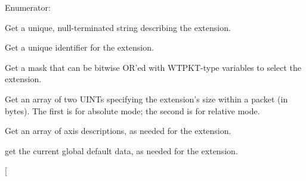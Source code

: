 \begin{Desc}
\item[Enumerator: ]\par
\begin{description}
\item[{\em 
\hypertarget{namespace_wintab_d_n_a52875c234488913934e0d49ac13c438d}{
EXT\_\-NAME}
\label{namespace_wintab_d_n_a52875c234488913934e0d49ac13c438d}
}]Get a unique, null-\/terminated string describing the extension. \item[{\em 
\hypertarget{namespace_wintab_d_n_a52875c234488913934e0d49ac13c438d}{
EXT\_\-TAG}
\label{namespace_wintab_d_n_a52875c234488913934e0d49ac13c438d}
}]Get a unique identifier for the extension. \item[{\em 
\hypertarget{namespace_wintab_d_n_a52875c234488913934e0d49ac13c438d}{
EXT\_\-MASK}
\label{namespace_wintab_d_n_a52875c234488913934e0d49ac13c438d}
}]Get a mask that can be bitwise OR'ed with WTPKT-\/type variables to select the extension. \item[{\em 
\hypertarget{namespace_wintab_d_n_a52875c234488913934e0d49ac13c438d}{
EXT\_\-SIZE}
\label{namespace_wintab_d_n_a52875c234488913934e0d49ac13c438d}
}]Get an array of two UINTs specifying the extension's size within a packet (in bytes). The first is for absolute mode; the second is for relative mode. \item[{\em 
\hypertarget{namespace_wintab_d_n_a52875c234488913934e0d49ac13c438d}{
EXT\_\-AXES}
\label{namespace_wintab_d_n_a52875c234488913934e0d49ac13c438d}
}]Get an array of axis descriptions, as needed for the extension. \item[{\em 
\hypertarget{namespace_wintab_d_n_a52875c234488913934e0d49ac13c438d}{
EXT\_\-DEFAULT}
\label{namespace_wintab_d_n_a52875c234488913934e0d49ac13c438d}
}]get the current global default data, as needed for the extension. \item[{\em 
}
\end{description}
\end{Desc}
